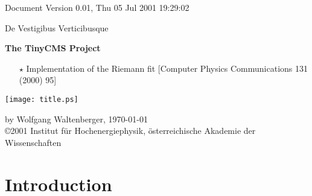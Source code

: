 \documentclass[a4paper,oneside]{book}
\begin{document}
\begin{titlepage}
{\vspace{2cm}
\begin{raggedleft}
Document Version 0.01, Thu 05 Jul 2001 19:29:02\\
\end{raggedleft}
\Large De Vestigibus Verticibusque\\[1ex]}
\begin{center}
\vspace*{0.3cm}
{\huge{\bf The TinyCMS Project}\\
\vspace{0.8cm}
\Large 
\begin{itemize}
\item[$\star$]{Implementation of the Riemann fit [Computer Physics Communications 131 (2000) 95]}
\end{itemize}
\vspace{2cm}
\mbox{\texttt{[image: title.ps]}}\\
\vspace{2cm}}
\large by Wolfgang Waltenberger, \today\\
\vspace*{4cm}
\copyright{2001 Institut f\"ur Hochenergiephysik, \"osterreichische Akademie der Wissenschaften}\\
\end{center}
\end{titlepage}
\clearemptydoublepage
{}
\tableofcontents
\clearemptydoublepage
{}
\chapter{Introduction}

\end{document}
